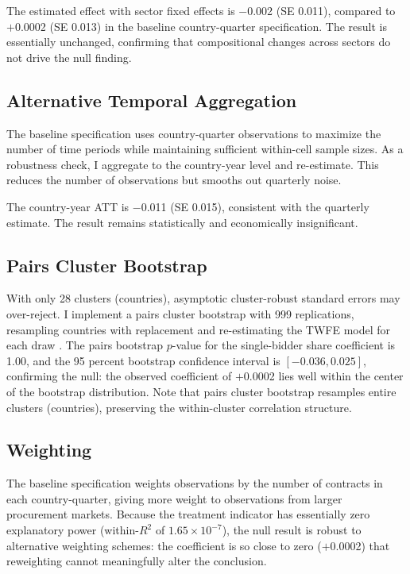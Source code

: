 \documentclass[12pt]{article}
\begin{document}
The estimated effect with sector fixed effects is $-$0.002 (SE 0.011), compared to $+$0.0002 (SE 0.013) in the baseline country-quarter specification. The result is essentially unchanged, confirming that compositional changes across sectors do not drive the null finding.

\subsection{Alternative Temporal Aggregation}

The baseline specification uses country-quarter observations to maximize the number of time periods while maintaining sufficient within-cell sample sizes. As a robustness check, I aggregate to the country-year level and re-estimate. This reduces the number of observations but smooths out quarterly noise.

The country-year ATT is $-$0.011 (SE 0.015), consistent with the quarterly estimate. The result remains statistically and economically insignificant.

\subsection{Pairs Cluster Bootstrap}

With only 28 clusters (countries), asymptotic cluster-robust standard errors may over-reject. I implement a pairs cluster bootstrap with 999 replications, resampling countries with replacement and re-estimating the TWFE model for each draw \citep{cameron2008}. The pairs bootstrap $p$-value for the single-bidder share coefficient is 1.00, and the 95 percent bootstrap confidence interval is $[-0.036, 0.025]$, confirming the null: the observed coefficient of $+$0.0002 lies well within the center of the bootstrap distribution. Note that pairs cluster bootstrap resamples entire clusters (countries), preserving the within-cluster correlation structure.

\subsection{Weighting}

The baseline specification weights observations by the number of contracts in each country-quarter, giving more weight to observations from larger procurement markets. Because the treatment indicator has essentially zero explanatory power (within-$R^2$ of $1.65 \times 10^{-7}$), the null result is robust to alternative weighting schemes: the coefficient is so close to zero ($+$0.0002) that reweighting cannot meaningfully alter the conclusion.
\end{document}
